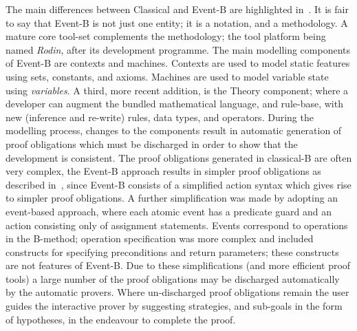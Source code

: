 The main differences between Classical and Event-B are highlighted in~\cite{Hallerstede07}. It is fair to say that Event-B is not just one entity;  it is a notation, and a methodology. A mature core tool-set complements the methodology; the tool platform being named \emph{Rodin}, after its development programme. The main modelling components of Event-B are contexts and machines. Contexts are used to model static features using sets, constants, and axioms. Machines are used to model variable state using \emph{variables}. A third, more recent addition, is the Theory component; where a developer can augment the bundled mathematical language, and rule-base, with new (inference and re-write) rules, data types, and operators. During the modelling process, changes to the components result in automatic generation of proof obligations which must be discharged in order to show that the development is consistent. The proof obligations generated in classical-B are often very complex, the Event-B approach results in simpler proof obligations as described in~\cite{Hallerstede07}, since Event-B consists of a simplified action syntax which gives rise to simpler proof obligations. A further simplification was made by adopting an event-based approach, where each atomic event has a predicate guard and an action consisting only of assignment statements. Events correspond to operations in the B-method; operation specification was more complex and included constructs for specifying preconditions and return parameters; these constructs are not features of Event-B. Due to these simplifications (and more efficient proof tools) a large number of the proof obligations may be discharged automatically by the automatic provers. Where un-discharged proof obligations remain the user guides the interactive prover by suggesting strategies, and sub-goals in the form of hypotheses, in the endeavour to complete the proof. 

